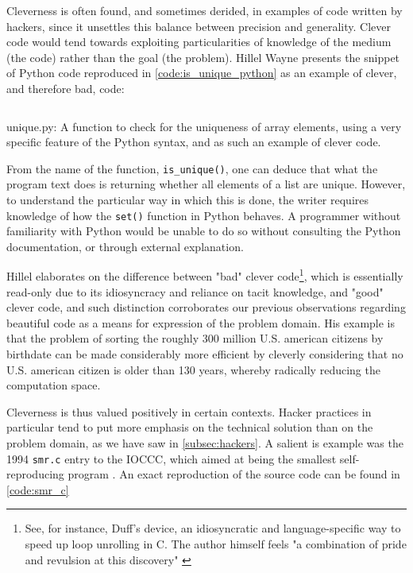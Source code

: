 Cleverness is often found, and sometimes derided, in examples of code written by hackers, since it unsettles this balance between precision and generality. Clever code would tend towards exploiting particularities of knowledge of the medium (the code) rather than the goal (the problem). Hillel Wayne presents the snippet of Python code reproduced in \autoref{code:is_unique_python} as an example of clever, and therefore bad, code:

\begin{listing}
  \inputminted{python}{./corpus/unique.py}
  \caption{unique.py: A function to check for the uniqueness of array elements, using a very specific feature of the Python syntax, and as such an example of clever code.}
  \label{code:is_unique_python}
\end{listing}

From the name of the function, \lstinline{is_unique()}, one can deduce that what the program text does is returning whether all elements of a list are unique. However, to understand the particular way in which this is done, the writer requires knowledge of how the \lstinline{set()} function in Python behaves. A programmer without familiarity with Python would be unable to do so without consulting the Python documentation, or through external explanation.

Hillel elaborates on the difference between "bad" clever code\footnote{See, for instance, Duff's device, an idiosyncratic and language-specific way to speed up loop unrolling in C. The author himself feels "a combination of pride and revulsion at this discovery" \citep{duff_tom_1983}}, which is essentially read-only due to its idiosyncracy and reliance on tacit knowledge, and "good" clever code, and such distinction corroborates our previous observations regarding beautiful code as a means for expression of the problem domain. His example is that the problem of sorting the roughly 300 million U.S. american citizens by birthdate can be made considerably more efficient by cleverly considering that no U.S. american citizen is older than 130 years, whereby radically reducing the computation space.

Cleverness is thus valued positively in certain contexts. Hacker practices in particular tend to put more emphasis on the technical solution than on the problem domain, as we have saw in \autoref{subsec:hackers}. A salient is example was the 1994 \lstinline{smr.c} entry to the IOCCC, which aimed at being the smallest self-reproducing program \citep{kanakarakis_international_2022}. An exact reproduction of the source code can be found in \autoref{code:smr_c}

